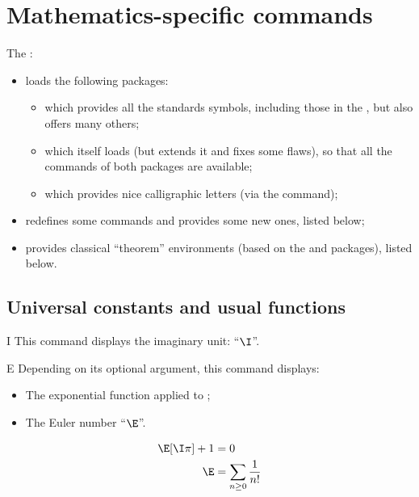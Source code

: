 \documentclass[english,nolocaltoc]{nwejmart}
\newtheorem[style=definition]{fact}
\newtheorem[title-plural=Criteria]{criterion}
\newtheorem[title=random experiment]{rexp}
\begin{document}
\section{Mathematics-specific commands}
\label{sec:comm-propr-aux}

The \nwejmauthorcl{}:
\begin{itemize}
\item loads the following packages:
  \begin{itemize}
  \item {} which provides all the standards symbols,
    including those in the , but also offers many others;
  \item {} which itself loads 
    (but extends it and fixes some flaws), so that all the commands of
    both packages are available;
  \item {} which provides nice calligraphic letters (via
    the  command);
  \end{itemize}
\item redefines some commands and provides some new ones, listed below;
\item provides classical \enquote{theorem} environments (based on the
   and  packages), listed below.
\end{itemize}

\subsection{Universal constants and usual functions}

\begin{docCommand}{I}{}
  This command displays the imaginary unit: \enquote{$\I$}.
\end{docCommand}

\begin{docCommand}{E}{}
 Depending on its optional  argument, this command displays:
  \begin{itemize}
  \item The exponential function applied to ;
  \item The Euler number \enquote{$\E$}.
  \end{itemize}
\end{docCommand}

\begin{bodycode}
\begin{align}
  \E[\I\pi]+1 & = 0 \\
  \E          & = \sum_{n\geq 0} \frac{1}{n!}
\end{align}
\end{bodycode}
\end{document}
